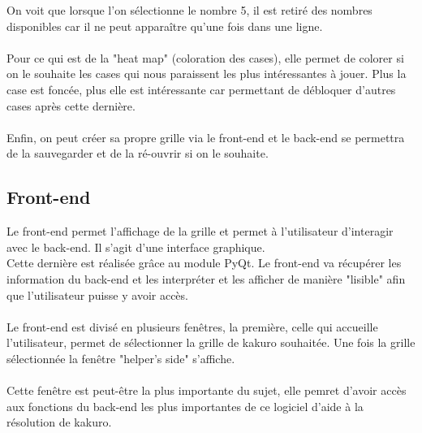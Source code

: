 \documentclass[12pt]{article}
\begin{document}
On voit que lorsque l'on sélectionne le nombre 5, il est retiré des nombres disponibles car il ne peut apparaître qu'une fois dans une ligne. \\ \\
Pour ce qui est de la "heat map" (coloration des cases), elle permet de colorer si on le souhaite les cases qui nous paraissent les plus intéressantes à jouer. Plus la case est foncée, plus elle est intéressante car permettant de débloquer d'autres cases après cette dernière. \\ \\
Enfin, on peut créer sa propre grille via le front-end et le back-end se permettra de la sauvegarder et de la ré-ouvrir si on le souhaite. 
\newpage
\subsection{Front-end}
Le front-end permet l'affichage de la grille et permet à l'utilisateur d'interagir avec le back-end. Il s'agit d'une interface graphique. \\ Cette dernière est réalisée grâce au module PyQt. Le front-end va récupérer les information du back-end et les interpréter et les afficher de manière "lisible" afin que l'utilisateur puisse y avoir accès. \\ \\
Le front-end est divisé en plusieurs fenêtres, la première, celle qui accueille l'utilisateur, permet de sélectionner la grille de kakuro souhaitée. Une fois la grille sélectionnée la fenêtre "helper's side" s'affiche. \\ \\ 
Cette fenêtre est peut-être la plus importante du sujet, elle pemret d'avoir accès aux fonctions du back-end les plus importantes de ce logiciel d'aide à la résolution de kakuro. \\
\end{document}
